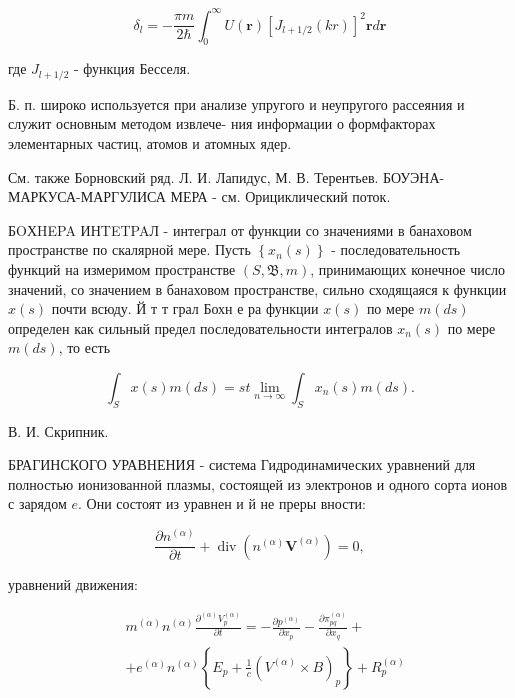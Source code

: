 \documentclass[10pt]{article}
\begin{document}
\[

\delta_{l}=-\frac{\pi m}{2 \hbar} \int_{0}^{\infty} U(\boldsymbol{r})\left[J_{l+1 / 2}(k r)\right]^{2} \boldsymbol{r} d \boldsymbol{r}

\]



где $J_{l+1 / 2}$ - функция Бесселя.



Б. п. широко используется при анализе упругого и неупругого рассеяния и служит основным методом извлече- ния информации о формфакторах элементарных частиц, атомов и атомных ядер.



См. также Борновский ряд. Л. И. Лапидус, М. В. Терентьев. БОУЭНА-МАРКУСА-МАРГУЛИСА МЕРА - см. Орициклический поток.



БOХHEPA ИНTETPAЛ - интеграл от функции со значениями в банаховом пространстве по скалярной мере. Пусть $\left\{x_{n}(s)\right\}$ - последовательность функций на измеримом пространстве $(S, \mathfrak{B}, m)$, принимающих конечное число значений, со значением в банаховом пространстве, сильно сходящаяся к функции $x(s)$ почти всюду. Й т т грал Бохн е ра функции $x(s)$ по мере $m(d s)$ определен как сильный предел последовательности интегралов $x_{n}(s)$ по мере $m(d s)$, то есть



\[

\int_{S} x(s) m(d s)=s t \lim _{n \rightarrow \infty} \int_{S} x_{n}(s) m(d s) .

\]



В. И. Скрипник.



БРАГИНСКОГО УРАВНЕНИЯ - система Гидродинамических уравнений для полностью ионизованной плазмы, состоящей из электронов и одного сорта ионов с зарядом $e$. Они состоят из уравнен и й не преры вности:



\[

\frac{\partial n^{(\alpha)}}{\partial t}+\operatorname{div}\left(n^{(\alpha)} \boldsymbol{V}^{(\alpha)}\right)=0,

\]



уравнений движения:



\[

\begin{aligned}

& m^{(\alpha)} n^{(\alpha)} \frac{\partial^{(\alpha)} V_{p}^{(\alpha)}}{\partial t}=-\frac{\partial p^{(\alpha)}}{\partial x_{p}}-\frac{\partial \pi_{p q}^{(\alpha)}}{\partial x_{q}}+ \\

& +e^{(\alpha)} n^{(\alpha)}\left\{E_{p}+\frac{1}{c}\left(V^{(\alpha)} \times B\right)_{p}\right\}+R_{p}^{(\alpha)}

\end{aligned}

\]
\end{document}
